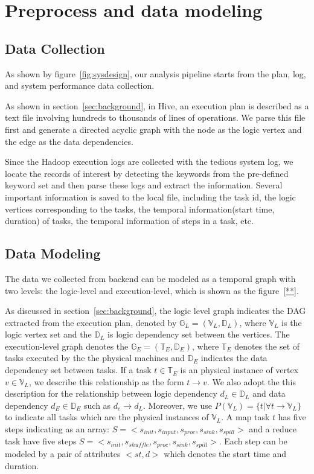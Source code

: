 \section{Preprocess and data modeling}
\subsection{Data Collection}
As shown by figure~\ref{fig:sysdesign}, our analysis pipeline starts from the plan, log, and system performance data collection.

As shown in section~\ref{sec:background}, in Hive, an execution plan is described as a text file involving hundreds to thousands of lines of operations. We parse this file first and generate a directed acyclic graph with the node as the logic vertex and the edge as the data dependencies.

Since the Hadoop execution logs are collected with the tedious system log, we locate the records of interest by detecting the keywords from the pre-defined keyword set and then parse these logs and extract the information.
Several important information is saved to the local file, including the task id, the logic vertices corresponding to the tasks, the temporal information(start time, duration) of tasks, the temporal information of steps in a task, etc. 

\subsection{Data Modeling}

The data we collected from backend can be modeled as a temporal graph with two levels: the logic-level and execution-level, which is shown as the figure~\ref{**}. 

As discussed in section~\ref{sec:background}, the logic level graph indicates the DAG extracted from the execution plan, denoted by $\mathbb{G}_L = (\mathbb{V}_L, \mathbb{D}_L)$, where $\mathbb{V}_L$ is the logic vertex set and the $\mathbb{D}_L$ is logic dependency set between the vertices. The execution-level graph denotes the $\mathbb{G}_E = (\mathbb{T}_E, \mathbb{D}_E)$, where $\mathbb{T}_E$ denotes the set of tasks executed by the the physical machines and $\mathbb{D}_E$ indicates the data dependency set between tasks. 
If a task $t \in \mathbb{T}_E$ is an physical instance of vertex $v \in \mathbb{V}_L$, we describe this relationship as the form $t \to v$. We also adopt the this description for the relationship between logic dependency $d_L \in \mathbb{D}_L$ and data dependency $d_E \in \mathbb{D}_E$ such as $d_e \to d_L$. Moreover, we use $P(\mathbb{V}_L) = \{t|\forall t \to \mathbb{V}_L\}$ to indicate all tasks which are the physical instances of $\mathbb{V}_L$. 
A map task $t$ has five steps indicating as an array: $S=<s_{init}, s_{input}, s_{proc}, s_{sink}, s_{spill}>$ and a reduce task have five steps $S=<s_{init}, s_{shuffle}, s_{proc}, s_{sink}, s_{spill}>$. Each step can be modeled by a pair of attributes $<st, d>$ which denotes the start time and duration. 

